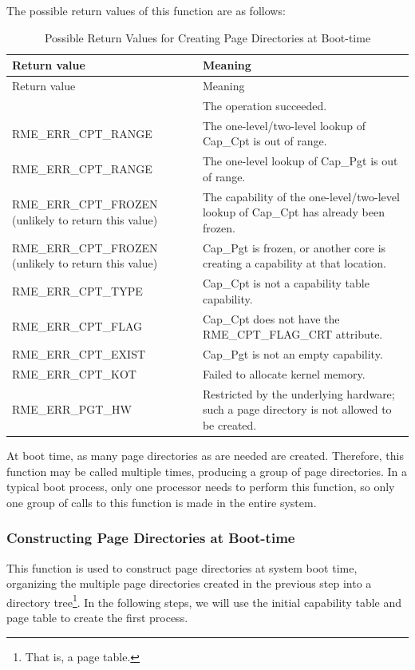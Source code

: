 The possible return values of this function are as follows:

\begin{xltabular}{\textwidth}{@{}>{\hsize\raggedright\arraybackslash}X>{\hsize\raggedright\arraybackslash}X@{}}
\caption{Possible Return Values for Creating Page Directories at Boot-time}\label{tab:7-46-create-page-directory-at-boot-return-values}\\
\toprule
Return value & Meaning\tabularnewline
\endfirsthead
\toprule
Return value & Meaning\tabularnewline
\midrule
\endhead
\bottomrule
{} & The operation succeeded.\tabularnewline
    RME\_ERR\_CPT\_RANGE & The one-level/two-level lookup of Cap\_Cpt is out of range.\tabularnewline
    RME\_ERR\_CPT\_RANGE & The one-level lookup of Cap\_Pgt is out of range.\tabularnewline
    RME\_ERR\_CPT\_FROZEN (unlikely to return this value) & The capability of the one-level/two-level lookup of Cap\_Cpt has already been frozen.\tabularnewline
    RME\_ERR\_CPT\_FROZEN (unlikely to return this value) & Cap\_Pgt is frozen, or another core is creating a capability at that location.\tabularnewline
    RME\_ERR\_CPT\_TYPE & Cap\_Cpt is not a capability table capability.\tabularnewline
    RME\_ERR\_CPT\_FLAG & Cap\_Cpt does not have the RME\_CPT\_FLAG\_CRT attribute.\tabularnewline
    RME\_ERR\_CPT\_EXIST & Cap\_Pgt is not an empty capability.\tabularnewline
    RME\_ERR\_CPT\_KOT & Failed to allocate kernel memory.\tabularnewline
    RME\_ERR\_PGT\_HW & Restricted by the underlying hardware; such a page directory is not allowed to be created.\tabularnewline
\end{xltabular}
\nopagebreak[4]

At boot time, as many page directories as are needed are created. Therefore, this function may be called multiple times, producing a group of page directories. In a typical boot process, only one processor needs to perform this function, so only one group of calls to this function is made in the entire system.

\subsubsection{Constructing Page Directories at Boot-time}\label{subsubsec:7-construct-page-directory-at-boot}

This function is used to construct page directories at system boot time, organizing the multiple page directories created in the previous step into a directory tree\footnote{That is, a page table.}. In the following steps, we will use the initial capability table and page table to create the first process.

